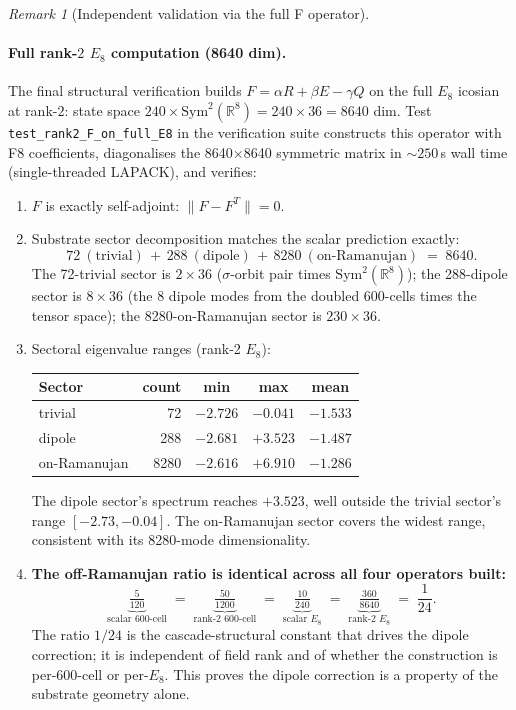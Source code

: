 \documentclass[11pt]{article}
\theoremstyle{plain}
\theoremstyle{definition}
\theoremstyle{remark}
\newtheorem{remark}[theorem]{Remark}
\newcommand{\Sym}{\mathrm{Sym}}
\begin{document}
\begin{remark}[Independent validation via the full F operator]
\paragraph{Full rank-$2$ $E_8$ computation (8640 dim).} The final structural verification builds $F = \alpha R + \beta E - \gamma Q$ on the full $E_8$ icosian at rank-$2$: state space $240 \times \Sym^2(\mathbb{R}^8) = 240 \times 36 = 8640$ dim. Test \texttt{test\_rank2\_F\_on\_full\_E8} in the verification suite constructs this operator with F8 coefficients, diagonalises the 8640$\times$8640 symmetric matrix in $\sim 250$\,s wall time (single-threaded LAPACK), and verifies:
\begin{enumerate}[leftmargin=2em]
\item $F$ is exactly self-adjoint: $\|F - F^T\| = 0$.
\item Substrate sector decomposition matches the scalar prediction exactly:
\[
  72\ (\text{trivial}) \,+\, 288\ (\text{dipole}) \,+\, 8280\ (\text{on-Ramanujan}) \;=\; 8640.
\]
The 72-trivial sector is $2 \times 36$ ($\sigma$-orbit pair times $\Sym^2(\mathbb{R}^8)$); the 288-dipole sector is $8 \times 36$ (the 8 dipole modes from the doubled 600-cells times the tensor space); the 8280-on-Ramanujan sector is $230 \times 36$.
\item Sectoral eigenvalue ranges (rank-2 $E_8$):
\begin{center}
\begin{tabular}{lrccc}
Sector & count & min & max & mean \\
\midrule
trivial & 72 & $-2.726$ & $-0.041$ & $-1.533$ \\
dipole & 288 & $-2.681$ & $+3.523$ & $-1.487$ \\
on-Ramanujan & 8280 & $-2.616$ & $+6.910$ & $-1.286$ \\
\end{tabular}
\end{center}
The dipole sector's spectrum reaches $+3.523$, well outside the trivial sector's range $[-2.73, -0.04]$. The on-Ramanujan sector covers the widest range, consistent with its 8280-mode dimensionality.
\item \textbf{The off-Ramanujan ratio is identical across all four operators built:}
\[
  \underbrace{\tfrac{5}{120}}_{\text{scalar 600-cell}} \;=\; \underbrace{\tfrac{50}{1200}}_{\text{rank-2 600-cell}} \;=\; \underbrace{\tfrac{10}{240}}_{\text{scalar $E_8$}} \;=\; \underbrace{\tfrac{360}{8640}}_{\text{rank-2 $E_8$}} \;=\; \frac{1}{24}.
\]
The ratio $1/24$ is the cascade-structural constant that drives the dipole correction; it is independent of field rank and of whether the construction is per-600-cell or per-$E_8$. This proves the dipole correction is a property of the substrate geometry alone.

\end{enumerate}
\end{remark}
\end{document}
